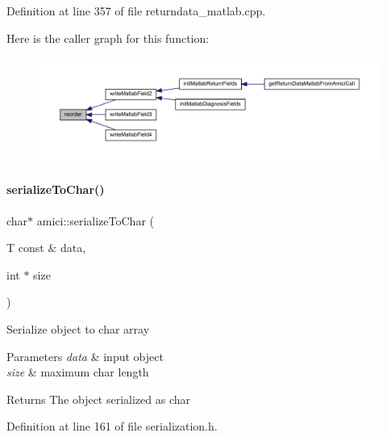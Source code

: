 Definition at line 357 of file returndata\+\_\+matlab.\+cpp.

Here is the caller graph for this function\+:
\nopagebreak
\begin{figure}[H]
\begin{center}
\leavevmode
\includegraphics[width=350pt]{namespaceamici_ac6d55e052cd87c2cbd7a5a26e8d11628_icgraph}
\end{center}
\end{figure}
\mbox{\label{namespaceamici_a042a9a4166aeef6cd263d9975a4192ed}} 
\paragraph{\texorpdfstring{serialize\+To\+Char()}{serializeToChar()}}
{\footnotesize\ttfamily char$\ast$ amici\+::serialize\+To\+Char (\begin{DoxyParamCaption}\item[{T const \&}]{data,  }\item[{int $\ast$}]{size }\end{DoxyParamCaption})}

Serialize object to char array


\begin{DoxyParams}{Parameters}
{\em data} & input object \\
\hline
{\em size} & maximum char length\\
\hline
\end{DoxyParams}
\begin{DoxyReturn}{Returns}
The object serialized as char
\end{DoxyReturn}


Definition at line 161 of file serialization.\+h.

\mbox{\label{namespaceamici_ad633859edca1bf95ecdbdb5500d3c28c}} 
